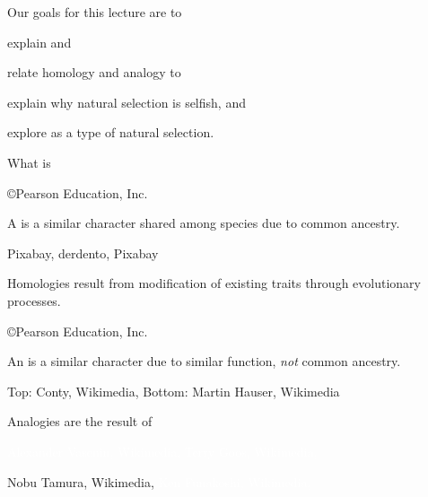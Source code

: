 \documentclass[t]{beamer}
\begin{document}
%

\begin{frame}{Our goals for this lecture are to }
	
	\hangpara explain  and 
	
	\hangpara relate homology and analogy to 

	\hangpara explain why natural selection is selfish, and
	
	
	\hangpara explore  as a type of natural selection.

\end{frame}
%
{
\begin{frame}[b]{What is }

	\hfill \tiny \copyright Pearson Education, Inc.

\end{frame}
}
%
{
\begin{frame}[b]{A  is a similar character shared among species due to common ancestry.}

	\vfilll

	\tiny Pixabay, \cc \hfill derdento, Pixabay \cc

\end{frame}
}
%
{
\begin{frame}[t]{Homologies result from modification of existing traits through evolutionary processes.}

	\vfilll

	\hfill \tiny \copyright Pearson Education, Inc.

\end{frame}
}
%
{
\begin{frame}[b]{An  is a similar character due to similar function, \emph{not} common ancestry.}


\tiny Top: Conty, Wikimedia,  \hfill Bottom: Martin Hauser, Wikimedia 
\end{frame}
}
%
{
\begin{frame}[t]{Analogies are the result of }

	\vspace{3.85cm}

	\tiny \textcolor{white}{Alexander Vasenin, Wikimedia, 
	\hfill Terry Goos, Wikimedia, }

	\vfilll

	\tiny Nobu Tamura, Wikimedia,  \hfill \textcolor{white}{Ken Funakoshi, Wikimedia, }

\end{frame}
}
\end{document}

